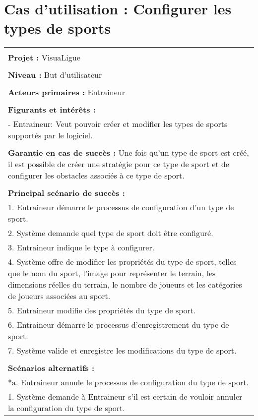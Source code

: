 \section{Cas d'utilisation : Configurer les types de sports}
\begin{longtable}{|p{16cm}|}
	\hline
	\\
	\textbf{Projet :} VisuaLigue\\
	\\
	\textbf{Niveau :} But d'utilisateur\\
	\\
	\textbf{Acteurs primaires :} Entraineur\\
	\\
	\textbf{Figurants et intérêts :} \\
	- Entraineur: Veut pouvoir créer et modifier les types de sports supportés par le logiciel.\\
	\\
	\textbf{Garantie en cas de succès :} Une fois qu'un type de sport est créé, il est possible de créer une stratégie pour ce type de sport et de configurer les obstacles associés à ce type de sport.\\
	\\
	\textbf{Principal scénario de succès :}\\
	1. Entraineur démarre le processus de configuration d'un  type de sport.\\
	2. Système demande quel type de sport doit être configuré.\\
	3. Entraineur indique le type à configurer.\\
	4. Système offre de modifier les propriétés du type de sport, telles que le nom du sport, l'image pour représenter le terrain, les dimensions réelles du terrain, le nombre de joueurs et les catégories de joueurs associées au sport.\\
	5. Entraineur modifie des propriétés du type de sport.\\
	6. Entraineur démarre le processus d'enregistrement du type de sport.\\
	7. Système valide et enregistre les modifications du type de sport.\\
	\\
	\textbf{Scénarios alternatifs :}\\
	*a. Entraineur annule le processus de configuration du type de sport.\\
	\hspace{1cm}1. Système demande à Entraineur s'il est certain de vouloir annuler la configuration du type de sport.\\

\end{longtable}
